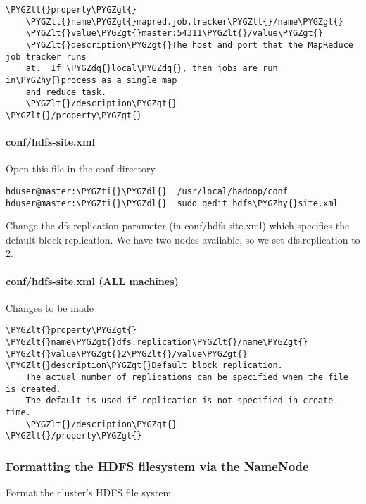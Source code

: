 \documentclass[letterpaper,10pt,english]{sphinxmanual}
\def\PYGZlt{\char`\<}
\def\PYGZgt{\char`\>}
\def\PYGZdl{\char`\$}
\def\PYGZhy{\char`\-}
\def\PYGZdq{\char`\"}
\def\PYGZti{\char`\~}
\begin{document}
\begin{Verbatim}[commandchars=\\\{\}]
\PYGZlt{}property\PYGZgt{}
    \PYGZlt{}name\PYGZgt{}mapred.job.tracker\PYGZlt{}/name\PYGZgt{}
    \PYGZlt{}value\PYGZgt{}master:54311\PYGZlt{}/value\PYGZgt{}
    \PYGZlt{}description\PYGZgt{}The host and port that the MapReduce job tracker runs
    at.  If \PYGZdq{}local\PYGZdq{}, then jobs are run in\PYGZhy{}process as a single map
    and reduce task.
    \PYGZlt{}/description\PYGZgt{}
\PYGZlt{}/property\PYGZgt{}
\end{Verbatim}


\paragraph{conf/hdfs-site.xml}
\label{hadoop:conf-hdfs-site-xml}
Open this file in the conf directory

\begin{Verbatim}[commandchars=\\\{\}]
hduser@master:\PYGZti{}\PYGZdl{}  /usr/local/hadoop/conf
hduser@master:\PYGZti{}\PYGZdl{}  sudo gedit hdfs\PYGZhy{}site.xml
\end{Verbatim}

Change the dfs.replication parameter (in conf/hdfs-site.xml) which specifies the default block replication.
We have two nodes available, so we set dfs.replication to 2.


\paragraph{conf/hdfs-site.xml (ALL machines)}
\label{hadoop:conf-hdfs-site-xml-all-machines}
Changes to be made

\begin{Verbatim}[commandchars=\\\{\}]
\PYGZlt{}property\PYGZgt{}
\PYGZlt{}name\PYGZgt{}dfs.replication\PYGZlt{}/name\PYGZgt{}
\PYGZlt{}value\PYGZgt{}2\PYGZlt{}/value\PYGZgt{}
\PYGZlt{}description\PYGZgt{}Default block replication.
    The actual number of replications can be specified when the file is created.
    The default is used if replication is not specified in create time.
    \PYGZlt{}/description\PYGZgt{}
\PYGZlt{}/property\PYGZgt{}
\end{Verbatim}


\subsubsection{Formatting the HDFS filesystem via the NameNode}
\label{hadoop:id9}
Format the cluster’s HDFS file system
\end{document}

